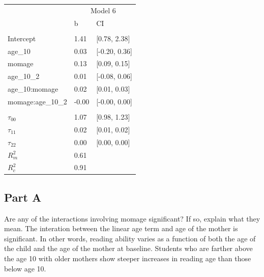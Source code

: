 \documentclass[]{article}
\begin{document}
\begin{table}[H]
\centering
\begin{tabular}{lll}
\toprule
\multicolumn{1}{c}{ } & \multicolumn{2}{c}{Model 6} \\
\cmidrule(l{2pt}r{2pt}){2-3}
 & b & CI\\
\midrule
\addlinespace[0.3em]
\multicolumn{3}{l}{\textbf{Fixed}}\\
\hspace{1em}Intercept & 1.41 & [0.78, 2.38]\\
\hspace{1em}age\_10 & 0.03 & [-0.20, 0.36]\\
\hspace{1em}momage & 0.13 & [0.09, 0.15]\\
\hspace{1em}age\_10\_2 & 0.01 & [-0.08, 0.06]\\
\hspace{1em}age\_10:momage & 0.02 & [0.01, 0.03]\\
\hspace{1em}momage:age\_10\_2 & -0.00 & [-0.00, 0.00]\\
\addlinespace[0.3em]
\multicolumn{3}{l}{\textbf{Random}}\\
\hspace{1em}$\tau_{00}$ & 1.07 & [0.98, 1.23]\\
\hspace{1em}$\tau_{11}$ & 0.02 & [0.01, 0.02]\\
\hspace{1em}$\tau_{22}$ & 0.00 & [0.00, 0.00]\\
$R^2_m$ & 0.61 & \\
$R^2_c$ & 0.91 & \\
\bottomrule
\end{tabular}
\end{table}

\subsection{Part A}\label{part-a-3}

Are any of the interactions involving momage significant? If so, explain
what they mean. The interation between the linear age term and age of
the mother is significant. In other words, reading ability varies as a
function of both the age of the child and the age of the mother at
baseline. Students who are farther above the age 10 with older mothers
show steeper increases in reading age than those below age 10.
\end{document}
